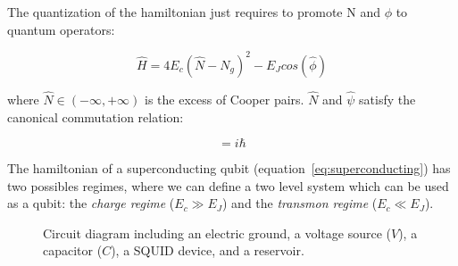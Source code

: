 The quantization of the hamiltonian just requires to promote N and $\phi$ to quantum operators:

\begin{equation}
    \hat{H} = 4 E_c (\hat{N} - N_g)^2 - E_J cos(\hat{\phi})
\label{eq:superconducting}
\end{equation}

where $\hat{N} \in (- \infty, + \infty)$ is the excess of Cooper pairs.
$\hat{N}$ and $\hat{\psi}$ satisfy the canonical commutation relation:

\begin{equation}
    [\hat{\phi}, \hat{N}] = i \hbar
\end{equation}

The hamiltonian of a superconducting qubit (equation~\ref{eq:superconducting}) has two possibles
regimes, where we can define a two level system which can be used as a qubit: the \textit{charge regime} ($E_c \gg E_J$) and 
the \textit{transmon regime} ($E_c \ll E_J$). 

\begin{figure}[ht]
    \centering
    \caption{Circuit diagram including an electric ground, a voltage source ($V$), a capacitor ($C$), a SQUID device, and a reservoir.}
    \label{fig:circuit}
\end{figure}








